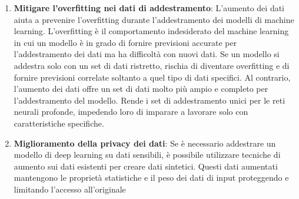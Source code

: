\documentclass[12pt,a4paper,openright,twoside]{book}
\begin{document}
\begin{enumerate}
\item \textbf{Mitigare l'overfitting nei dati di addestramento}:
L'aumento dei dati aiuta a prevenire l'overfitting durante l'addestramento dei modelli di machine learning. L'overfitting è il comportamento indesiderato del machine learning in cui un modello è in grado di fornire previsioni accurate per l'addestramento dei dati ma ha difficoltà con nuovi dati. Se un modello si addestra solo con un set di dati ristretto, rischia di diventare overfitting e di fornire previsioni correlate soltanto a quel tipo di dati specifici. Al contrario, l'aumento dei dati offre un set di dati molto più ampio e completo per l'addestramento del modello. Rende i set di addestramento unici per le reti neurali profonde, impedendo loro di imparare a lavorare solo con caratteristiche specifiche.

\item \textbf{Miglioramento della privacy dei dati}:
Se è necessario addestrare un modello di deep learning su dati sensibili, è possibile utilizzare tecniche di aumento sui dati esistenti per creare dati sintetici. Questi dati aumentati mantengono le proprietà statistiche e il peso dei dati di input proteggendo e limitando l'accesso all'originale
\end{enumerate}
\end{document}
